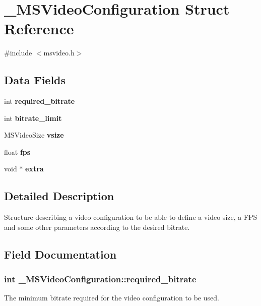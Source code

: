 \section{\-\_\-\-M\-S\-Video\-Configuration Struct Reference}
\label{struct__MSVideoConfiguration}


{\ttfamily \#include $<$msvideo.\-h$>$}

\subsection*{Data Fields}
\begin{DoxyCompactItemize}
\item 
int {\bf required\-\_\-bitrate}
\item 
int {\bf bitrate\-\_\-limit}
\item 
M\-S\-Video\-Size {\bf vsize}
\item 
float {\bf fps}
\item 
void $\ast$ {\bf extra}
\end{DoxyCompactItemize}


\subsection{Detailed Description}
Structure describing a video configuration to be able to define a video size, a F\-P\-S and some other parameters according to the desired bitrate. 

\subsection{Field Documentation}
\subsubsection[{required\-\_\-bitrate}]{\setlength{\rightskip}{0pt plus 5cm}int \-\_\-\-M\-S\-Video\-Configuration\-::required\-\_\-bitrate}\label{struct__MSVideoConfiguration_a972faef0b419301d6cb23f29ac0183cf}
The minimum bitrate required for the video configuration to be used. 
